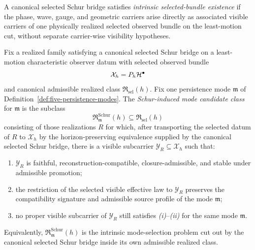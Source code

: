\begin{definition}
\label{def:intrinsic-selected-bundle-existence}
A canonical selected Schur bridge satisfies
\emph{intrinsic selected-bundle existence} if the phase, wave, gauge, and
geometric carriers arise directly as associated visible carriers of one
physically realized selected observed bundle on the least-motion cut, without
separate carrier-wise visibility hypotheses.
\end{definition}

\begin{definition}
\label{def:schur-induced-mode-candidate-class}
Fix a realized family satisfying a canonical selected Schur bridge on a
least-motion characteristic observer datum with selected observed bundle
\[
\mathcal X_h=P_h\mathcal{H}^\bullet
\]
and canonical admissible realized class
\(\mathfrak R_{\mathrm{sel}}(h)\). Fix one persistence mode \(\mathfrak m\) of
Definition~\ref{def:five-persistence-modes}. The \emph{Schur-induced mode
candidate class} for \(\mathfrak m\) is the subclass
\[
\mathfrak R^{\mathrm{Schur}}_{\mathfrak m}(h)\subseteq
\mathfrak R_{\mathrm{sel}}(h)
\]
consisting of those realizations \(R\) for which, after transporting the
selected datum of \(R\) to \(\mathcal X_h\) by the horizon-preserving
equivalence supplied by the canonical selected Schur bridge, there is a visible
subcarrier \(\mathcal Y_R\subseteq \mathcal X_h\) such that:
\begin{enumerate}[label=(\roman*), leftmargin=2em, itemsep=0.2em]
\item \(\mathcal Y_R\) is faithful, reconstruction-compatible,
      closure-admissible, and stable under admissible promotion;
\item the restriction of the selected visible effective law to
      \(\mathcal Y_R\) preserves the compatibility signature and admissible
      source profile of the mode \(\mathfrak m\);
\item no proper visible subcarrier of \(\mathcal Y_R\) still satisfies
      \emph{(i)}--\emph{(ii)} for the same mode \(\mathfrak m\).
\end{enumerate}
Equivalently, \(\mathfrak R^{\mathrm{Schur}}_{\mathfrak m}(h)\) is the
intrinsic mode-selection problem cut out by the canonical selected Schur bridge
inside its own admissible realized class.
\end{definition}

